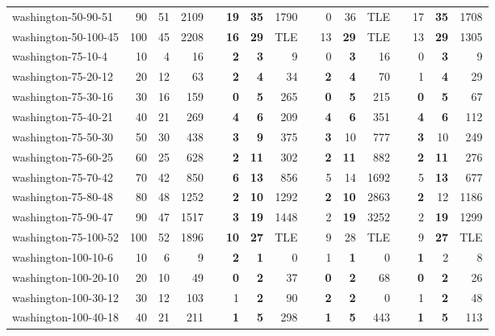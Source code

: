 \begin{table}[!ht]
{\begin{tabular}{lrrrrrrrrrrrlrrr}
washington-50-90-51 & 90 & 51 & 2109 &  & \textbf{19} & \textbf{35} & 1790 &  & 0 & 36 & TLE &  & 17 & \textbf{35} & 1708 \\
washington-50-100-45 & 100 & 45 & 2208 &  & \textbf{16} & \textbf{29} & TLE &  & 13 & \textbf{29} & TLE &  & 13 & \textbf{29} & 1305 \\ \hline
washington-75-10-4 & 10 & 4 & 16 &  & \textbf{2} & \textbf{3} & 9 &  & 0 & \textbf{3} & 16 &  & 0 & \textbf{3} & 9 \\
washington-75-20-12 & 20 & 12 & 63 &  & \textbf{2} & \textbf{4} & 34 &  & \textbf{2} & \textbf{4} & 70 &  & 1 & \textbf{4} & 29 \\
washington-75-30-16 & 30 & 16 & 159 &  & \textbf{0} & \textbf{5} & 265 &  & \textbf{0} & \textbf{5} & 215 &  & \textbf{0} & \textbf{5} & 67 \\
washington-75-40-21 & 40 & 21 & 269 &  & \textbf{4} & \textbf{6} & 209 &  & \textbf{4} & \textbf{6} & 351 &  & \textbf{4} & \textbf{6} & 112 \\
washington-75-50-30 & 50 & 30 & 438 &  & \textbf{3} & \textbf{9} & 375 &  & \textbf{3} & 10 & 777 &  & \textbf{3} & 10 & 249 \\
washington-75-60-25 & 60 & 25 & 628 &  & \textbf{2} & \textbf{11} & 302 &  & \textbf{2} & \textbf{11} & 882 &  & \textbf{2} & \textbf{11} & 276 \\
washington-75-70-42 & 70 & 42 & 850 &  & \textbf{6} & \textbf{13} & 856 &  & 5 & 14 & 1692 &  & 5 & \textbf{13} & 677 \\
washington-75-80-48 & 80 & 48 & 1252 &  & \textbf{2} & \textbf{10} & 1292 &  & \textbf{2} & \textbf{10} & 2863 &  & \textbf{2} & 12 & 1186 \\
washington-75-90-47 & 90 & 47 & 1517 &  & \textbf{3} & \textbf{19} & 1448 &  & 2 & \textbf{19} & 3252 &  & 2 & \textbf{19} & 1299 \\
washington-75-100-52 & 100 & 52 & 1896 &  & \textbf{10} & \textbf{27} & TLE &  & 9 & 28 & TLE &  & 9 & \textbf{27} & TLE \\ \hline
washington-100-10-6 & 10 & 6 & 9 &  & \textbf{2} & \textbf{1} & 0 &  & 1 & \textbf{1} & 0 &  & \textbf{1} & 2 & 8 \\
washington-100-20-10 & 20 & 10 & 49 &  & \textbf{0} & \textbf{2} & 37 &  & \textbf{0} & \textbf{2} & 68 &  & \textbf{0} & \textbf{2} & 26 \\
washington-100-30-12 & 30 & 12 & 103 &  & 1 & \textbf{2} & 90 &  & \textbf{2} & \textbf{2} & 0 &  & 1 & \textbf{2} & 48 \\
washington-100-40-18 & 40 & 21 & 211 &  & \textbf{1} & \textbf{5} & 298 &  & \textbf{1} & \textbf{5} & 443 &  & \textbf{1} & \textbf{5} & 113 \\

\end{tabular}}
\end{table}
